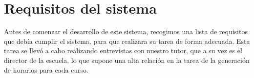     


\section{Requisitos del sistema}

Antes de comenzar el desarrollo de este sistema, recogimos una lista de requisitos que debía cumplir el sistema, para que realizara su tarea de forma adecuada. Esta tarea se llevó a cabo realizando entrevistas con nuestro tutor, que a su vez es el director de la escuela, lo que supone una alta relación en la tarea de la generación de horarios para cada curso. 

